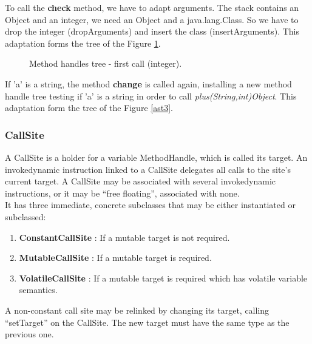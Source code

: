 \documentclass{sig-alternate}
\begin{document}
      To call the {\bf check} method, we have to adapt arguments.
      The stack contains an Object and an integer, we need an Object and a java.lang.Class.
      So we have to drop the integer (dropArguments) and insert the class (insertArguments).
      This adaptation forms the tree of the Figure \ref{ast2}.

      \begin{figure}[!h]
        \hspace{-.6in} \resizebox{1.3\linewidth}{!}{}
        \caption{Method handles tree - first call (integer).}
        \label{ast2}
      \end{figure}

      If 'a' is a string, the method {\bf change} is called again,
      installing a new method handle tree testing if 'a' is a string in order to call {\it plus(String,int)Object}.
      This adaptation form the tree of the Figure \ref{ast3}.

      \begin{figure*}
        \centering \resizebox{.9\linewidth}{!}{}
        \caption{Method handles tree - second call (string).}
        \label{ast3}
      \end{figure*}

    \subsubsection{CallSite}

      A CallSite is a holder for a variable MethodHandle, which is called its target.
      An invokedynamic instruction linked to a CallSite delegates all calls to the site's current target.
      A CallSite may be associated with several invokedynamic instructions,
      or it may be ``free floating'', associated with none.\\

      It has three immediate, concrete subclasses that may be either instantiated or subclassed:
      \begin{enumerate}
        \item \textbf{ConstantCallSite} : If a mutable target is not required.
        \item \textbf{MutableCallSite}  : If a mutable target is required.
        \item \textbf{VolatileCallSite} : If a mutable target is required which has volatile variable semantics.
      \end{enumerate}
      A non-constant call site may be relinked by changing its target, calling ``setTarget'' on the CallSite.
      The new target must have the same type as the previous one.
\end{document}
